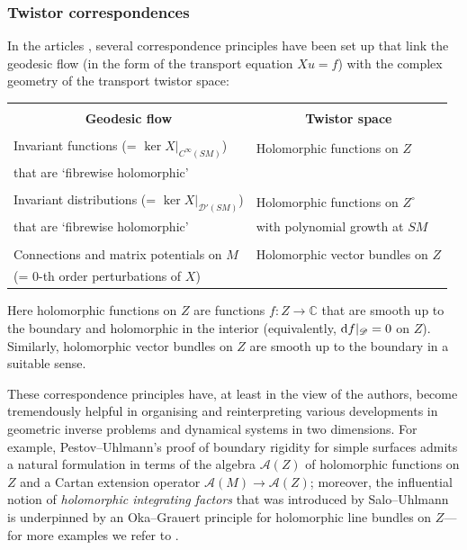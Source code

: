 \documentclass[10pt,a4paper]{amsart}
\numberwithin{equation}{section}
\theoremstyle{definition}
\newcommand{\C}{\mathbb{C}} %
\newcommand{\1}{{\bf 1}}
\begin{document}
\subsubsection{Twistor correspondences}\label{s_correspondences}
In the articles \cite{BLP24,BoPa23}, several correspondence principles have been set up that link the geodesic flow (in the form of the transport equation $Xu=f$) with the complex geometry of the transport twistor space:
	
	\begin{center}
\begin{tabular}{|l||l|}
	\hline
	&\\[-1em]
	\multicolumn{1}{|c||}{\textbf{Geodesic flow}} &\multicolumn{1}{c|}{\textbf{Twistor space}}\\
	\hline
	& \\[-1em]
		Invariant functions (= $\ker X|_{C^\infty(SM)}$)& Holomorphic functions on $Z$\\
		that are `fibrewise holomorphic' &\\
		&\\[-.8em]
		Invariant distributions (= $\ker X|_{\mathcal D'(SM)}$) & Holomorphic functions on $Z^\circ$\\that are `fibrewise holomorphic'& with polynomial growth at $SM$\\
	&\\[-.8em]
		Connections and matrix potentials on $M$ & Holomorphic vector bundles on $Z$\\
		(= $0$-th order perturbations of $X$) &\\
		\hline
	\end{tabular}
	\end{center}

\noindent	Here holomorphic functions on $Z$ are functions $f\colon Z\rightarrow \C$ that are smooth up to the boundary and holomorphic in the interior (equivalently, ${\rm d}f|_\mathscr D = 0$ on $Z$). Similarly, holomorphic vector bundles on $Z$ are smooth up to the boundary in a suitable sense.


	
 These correspondence principles have, at least in the view of the authors, become tremendously helpful in organising and reinterpreting various developments in geometric inverse problems and dynamical systems in two dimensions. For example, Pestov--Uhlmann's proof of boundary rigidity for simple surfaces \cite{PeUh05} admits a natural formulation in terms of the algebra $\mathcal A(Z)$ of holomorphic functions on $Z$ and a Cartan extension operator $\mathcal A(M)\to \mathcal A(Z)$; moreover, the influential notion of {\it holomorphic integrating factors} that was introduced by Salo--Uhlmann~\cite{SaUh11}
is underpinned by an Oka--Grauert principle for holomorphic line bundles on $Z$---for more examples we refer to \cite{BLP24,BoPa23}.
\end{document}
